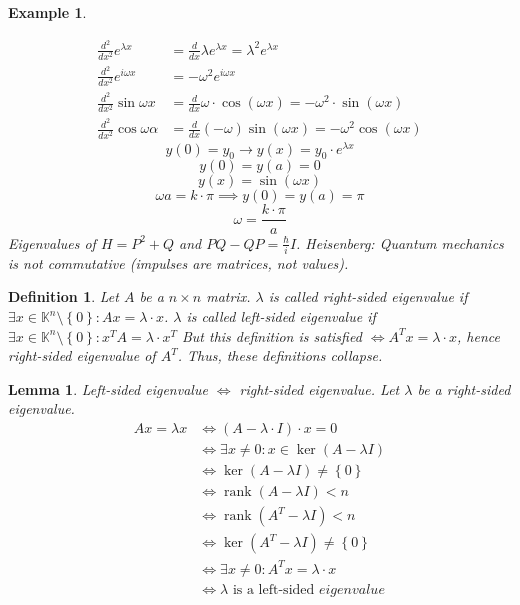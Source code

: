 \documentclass{article}
\newtheorem{example}{Example}  \numberwithin{example}{section}
\newtheorem{definition}{Definition}  \numberwithin{definition}{section}
\newtheorem{lemma}{Lemma}  \numberwithin{lemma}{section}
\newcommand{\set}[1]{\left\{#1\right\}}
\DeclareMathOperator{\rank}{rank}
\begin{document}
\begin{example}
\begin{enumerate}
\begin{align*}
        \frac{d^2}{dx^2} e^{\lambda x} &= \frac{d}{dx} \lambda e^{\lambda x} = \lambda^2 e^{\lambda x} \\
        \frac{d^2}{dx^2} e^{i \omega x} &= -\omega^2 e^{i\omega x} \\
        \frac{d^2}{dx^2} \sin{\omega x} &= \frac{d}{dx} \omega \cdot \cos(\omega x) = -\omega^2 \cdot \sin(\omega x) \\
        \frac{d^2}{dx^2} \cos{\omega \alpha} &= \frac{d}{dx} (-\omega) \sin(\omega x) = -\omega^2 \cos(\omega x)
      \end{align*}
      \[ y(0) = y_0 \to y(x) = y_0 \cdot e^{\lambda x} \]
      \[ y(0) = y(a) = 0 \]
      \[ y(x) = \sin(\omega x) \]
      \[ \omega a = k \cdot \pi \implies y(0) = y(a) = \pi \]
      \[ \omega = \frac{k \cdot \pi}{a} \]
      Eigenvalues of $H = P^2 + Q$ and $PQ - QP = \frac{\hbar}{i} I$. Heisenberg: Quantum mechanics is not commutative (impulses are matrices, not values).
  \end{enumerate}
\end{example}

\begin{definition} %
  Let $A$ be a $n \times n$ matrix.
  $\lambda$ is called right-sided eigenvalue if $\exists x \in \mathbb K^n \setminus \set{0}: Ax = \lambda \cdot x$.
  $\lambda$ is called left-sided eigenvalue if $\exists x \in \mathbb K^n \setminus \set{0}: x^T A = \lambda \cdot x^T$
  But this definition is satisfied $\iff A^T x = \lambda \cdot x$, hence right-sided eigenvalue of $A^T$.
  Thus, these definitions collapse.
\end{definition}

\begin{lemma} %
  Left-sided eigenvalue $\iff$ right-sided eigenvalue.
  Let $\lambda$ be a right-sided eigenvalue.
  \begin{align*}
    Ax = \lambda x &\iff (A - \lambda \cdot I) \cdot x = 0 \\
      &\iff \exists x \neq 0: x \in \ker(A - \lambda I) \\
      &\iff \ker(A - \lambda I) \neq \set{0} \\
      &\iff \rank(A - \lambda I) < n \\
      &\iff \rank(A^T - \lambda I) < n \\
      &\iff \ker(A^T - \lambda I) \neq \set{0} \\
      &\iff \exists x \neq 0: A^T x = \lambda \cdot x \\
      &\iff \lambda \text{ is a left-sided } eigenvalue
  \end{align*}
\end{lemma}
\end{document}
